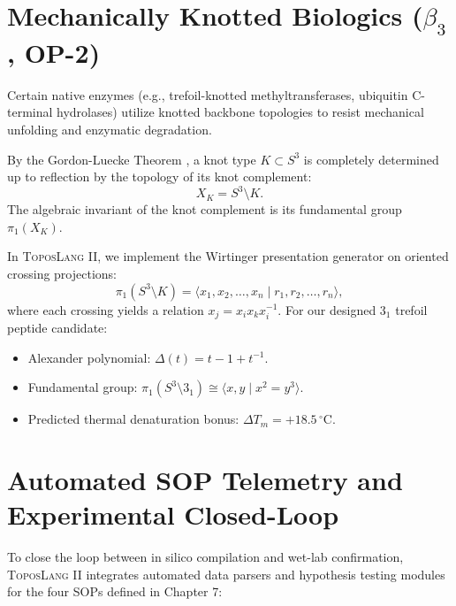 \documentclass[11pt, a4paper]{article}
\theoremstyle{definition}
\theoremstyle{plain}
\theoremstyle{remark}
\newcommand{\ToposLang}{\textsc{ToposLang}}
\begin{document}
\section{Mechanically Knotted Biologics (\texorpdfstring{$\beta_3$}{beta_3}, OP-2)}
\label{sec:knot_mechanics}

Certain native enzymes (e.g., trefoil-knotted methyltransferases, ubiquitin C-terminal hydrolases) utilize knotted backbone topologies to resist mechanical unfolding and enzymatic degradation. 

By the Gordon-Luecke Theorem \cite{gordon1989knots}, a knot type $K \subset S^3$ is completely determined up to reflection by the topology of its knot complement:
\begin{equation}
    X_K = S^3 \setminus K.
\end{equation}
The algebraic invariant of the knot complement is its fundamental group $\pi_1(X_K)$.

In \ToposLang{} II, we implement the Wirtinger presentation generator on oriented crossing projections:
\begin{equation}
    \pi_1(S^3 \setminus K) = \langle x_1, x_2, \dots, x_n \mid r_1, r_2, \dots, r_n \rangle,
\end{equation}
where each crossing yields a relation $x_j = x_i x_k x_i^{-1}$.
For our designed $3_1$ trefoil peptide candidate:
\begin{itemize}
    \item Alexander polynomial: $\Delta(t) = t - 1 + t^{-1}$.
    \item Fundamental group: $\pi_1(S^3 \setminus 3_1) \cong \langle x, y \mid x^2 = y^3 \rangle$.
    \item Predicted thermal denaturation bonus: $\Delta T_m = +18.5\,^\circ\text{C}$.
\end{itemize}

\section{Automated SOP Telemetry and Experimental Closed-Loop}
\label{sec:sop_telemetry}

To close the loop between in silico compilation and wet-lab confirmation, \ToposLang{} II integrates automated data parsers and hypothesis testing modules for the four SOPs defined in Chapter 7:
\end{document}
